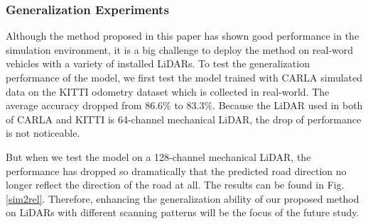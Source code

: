 \documentclass[letterpaper,10 pt,conference]{ieeeconf}  %
\begin{document}
\subsubsection{Generalization Experiments}
Although the method proposed in this paper has shown good performance in the simulation environment, it is a big challenge to deploy the method on real-word vehicles with a variety of installed LiDARs. To test the generalization performance of the model, we first test the model trained with CARLA simulated data on the KITTI\cite{38,39} odometry dataset which is collected in real-world. The average accuracy dropped from $86.6\%$ to $83.3\%$. Because the LiDAR used in both of CARLA and KITTI is 64-channel mechanical LiDAR, the drop of performance is not noticeable. 

But when we test the model on a 128-channel mechanical LiDAR, the performance has dropped so dramatically that the predicted road direction no longer reflect the direction of the road at all. The results can be found in Fig. \ref{sim2rel}. Therefore, enhancing the generalization ability of our proposed method on LiDARs with different scanning patterns will be the focus of the future study.
\end{document}
